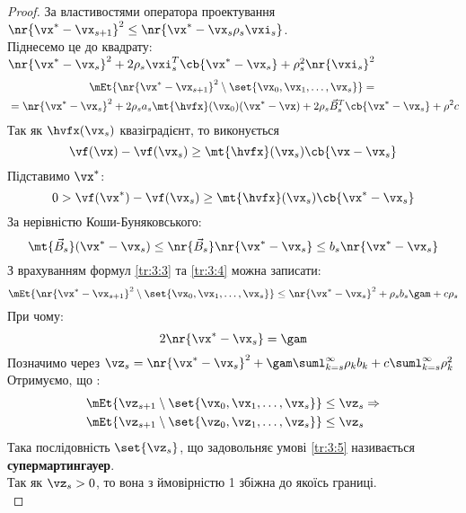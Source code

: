 \begin{proof}
За властивостями оператора проектування $\nr{\vx^\ast-\vx_{s+1}}^2 \leq \nr{\vx^\ast - \vx_s\rho_s\vxi_s}$.\\
Піднесемо це до квадрату: $\nr{\vx^\ast-\vx_s}^2 +2\rho_s \vxi_s^T \cb{\vx^\ast-\vx_s} +\rho^2_s \nr{\vxi_s}^2$ \\
\begin{multline}\label{tr:3:6}
\mEt{\nr{\vx^\ast-\vx_{s+1}}^2\setminus\set{\vx_0,\vx_1,\ldots,\vx_s}} = {} \\ {} =\nr{\vx^\ast-\vx_s} ^2 + 2\rho_sa_s \mt{\hvfx}(\vx_0)(\vx^\ast-\vx) +2\rho_s \vec{B}_s^T \cb{\vx^\ast-\vx_s}+\rho^2 c
\end{multline}
Так як $\hvfx(\vx_s)$ квазіградієнт, то виконується
\begin{equation}
\vf(\vx) - \vf(\vx_s) \geq \mt{\hvfx} (\vx_s) \cb{\vx-\vx_s}
\end{equation}
Підставимо $\vx^\ast$: \\
\begin{equation}\label{tr:3:3}
0 > \vf(\vx^\ast) - \vf(\vx_s) \geq \mt{\hvfx} (\vx_s) \cb{\vx^\ast-\vx_s}
\end{equation}
За нерівністю Коши-Буняковського:
\begin{equation}\label{tr:3:4}
\mt{\vec{B}_s} (\vx^\ast-\vx_s) \leq \nr{\vec{B}_s} \nr{\vx^\ast-\vx_s} \leq b_s \nr{\vx^\ast-\vx_s}
\end{equation}
З врахуванням формул \eqref{tr:3:3} та \eqref{tr:3:4} можна записати:
\begin{equation}
\mEt{\nr{\vx^\ast-\vx_{s+1}}^2\setminus\set{\vx_0,\vx_1,\ldots,\vx_s}} \leq \nr{\vx^\ast-\vx_s}^2 + \rho_s b_s \gam + c\rho_s
\end{equation}
При чому:
\begin{equation}
2\nr{\vx^\ast-\vx_s} = \gam
\end{equation}
Позначимо через $\vz_s = \nr{\vx^\ast-\vx_s}^2 + \gam\suml_{k=s}^\infty \rho_k b_k + c\suml_{k=s}^\infty \rho^2_k$\\
Отримуємо, що :
\begin{eqnarray}
&\mEt{\vz_{s+1}\setminus\set{\vx_0,\vx_1,\ldots,\vx_s}} \leq \vz_s \Rightarrow\\
&\mEt{\vz_{s+1}\setminus\set{\vz_0,\vz_1,\ldots,\vz_s}} \leq \vz_s \label{tr:3:5}
\end{eqnarray}
Така послідовність $\set{\vz_s}$, що задовольняє умові \eqref{tr:3:5} називається \textbf{супермартингауер}. \\
Так як $\vz_s>0$, то вона з ймовірністю 1 збіжна до якоїсь границі.\\

\end{proof}
